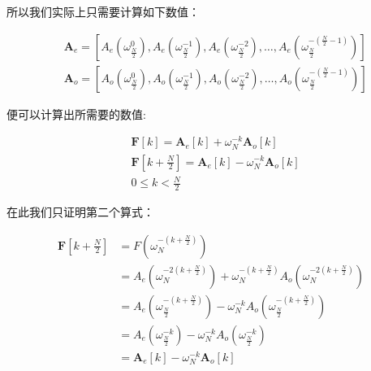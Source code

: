\documentclass[UTF8]{book}
\begin{document}
所以我们实际上只需要计算如下数值：
\begin{large}
    \begin{equation}
        \begin{aligned}
            &\mathbf{A}_e=\left [ A_{e}(\omega_{\frac{N}{2}}^{0}),A_{e}(\omega_{\frac{N}{2}}^{-1}),A_{e}(\omega_{\frac{N}{2}}^{-2}),\dots ,A_{e}(\omega_{\frac{N}{2}}^{-(\frac{N}{2}-1)}) \right ] \\
            &\mathbf{A}_o=\left [ A_{o}(\omega_{\frac{N}{2}}^{0}),A_{o}(\omega_{\frac{N}{2}}^{-1}),A_{o}(\omega_{\frac{N}{2}}^{-2}),\dots ,A_{o}(\omega_{\frac{N}{2}}^{-(\frac{N}{2}-1)}) \right ]
            \nonumber
        \end{aligned}
    \end{equation}
\end{large}
便可以计算出所需要的数值:
\begin{large}
    \begin{equation}
        \begin{aligned}
            &\mathbf{F}\left [ k \right ]=\mathbf{A}_e\left [ k \right ]+\omega_N^{-k}\mathbf{A}_o\left [ k \right ] \\
            &\mathbf{F}\left [ k+\frac{N}{2} \right ]=\mathbf{A}_e\left [ k \right ]-\omega_N^{-k}\mathbf{A}_o\left [ k \right ] \\
            &0 \le k < \frac{N}{2}
            \nonumber
        \end{aligned}
    \end{equation}
\end{large}
在此我们只证明第二个算式：
\begin{large}
    \begin{equation}
        \begin{aligned}
            \mathbf{F}\left [ k+\frac{N}{2} \right ] &= F(\omega_N^{-(k+\frac{N}{2})}) \\
            &= A_e(\omega_N^{-2(k+\frac{N}{2})})+\omega_N^{-(k+\frac{N}{2})}A_o(\omega_N^{-2(k+\frac{N}{2})}) \\
            &= A_e(\omega_{\frac{N}{2}}^{-(k+\frac{N}{2})})-\omega_N^{-k}A_o(\omega_{\frac{N}{2}}^{-(k+\frac{N}{2})}) \\
            &= A_e(\omega_{\frac{N}{2}}^{-k})-\omega_N^{-k}A_o(\omega_{\frac{N}{2}}^{-k}) \\
            &= \mathbf{A}_e\left [ k \right ]-\omega_N^{-k}\mathbf{A}_o\left [ k \right ]
            \nonumber
        \end{aligned}
    \end{equation}
\end{large}
\end{document}
